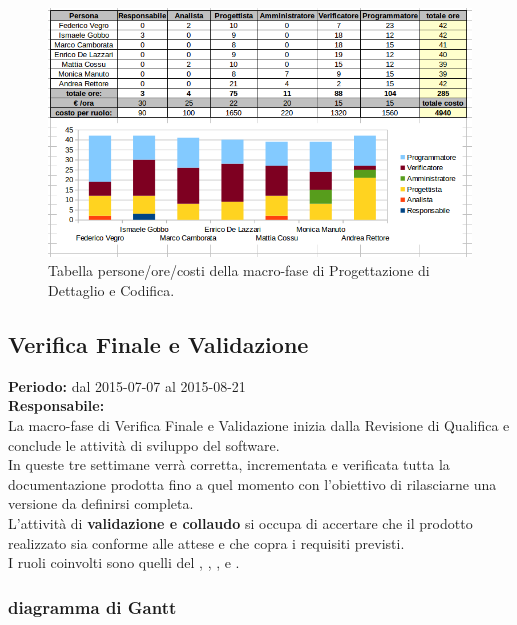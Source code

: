 \begin{figure}[h]
\begin{center}
\includegraphics[width=\textwidth, height=\textheight, keepaspectratio]{img/progdet-personeorecosti.png}
\caption{Tabella persone/ore/costi della macro-fase di Progettazione di Dettaglio e Codifica.}
\end{center}
\end{figure}

\newpage
\subsection{Verifica Finale e Validazione}
\textbf{Periodo:} dal 2015-07-07 al 2015-08-21 \\
\textbf{Responsabile:} \CaMa \\
La macro-fase di Verifica Finale e Validazione inizia dalla Revisione di Qualifica e conclude le attività di sviluppo del software. \\
In queste tre settimane verrà corretta, incrementata e verificata tutta la documentazione prodotta fino a quel momento con l'obiettivo di rilasciarne una versione da definirsi completa. \\
L'attività di \textbf{validazione e collaudo} si occupa di accertare che il prodotto realizzato sia conforme alle attese e che copra i requisiti previsti. \\
I ruoli coinvolti sono quelli del \ruoloResponsabile{}, \ruoloAmministratore{}, \ruoloProgettista{}, \ruoloVerificatore{} e \ruoloProgrammatore{}. \\

\newpage
\subsubsection{diagramma di Gantt}

